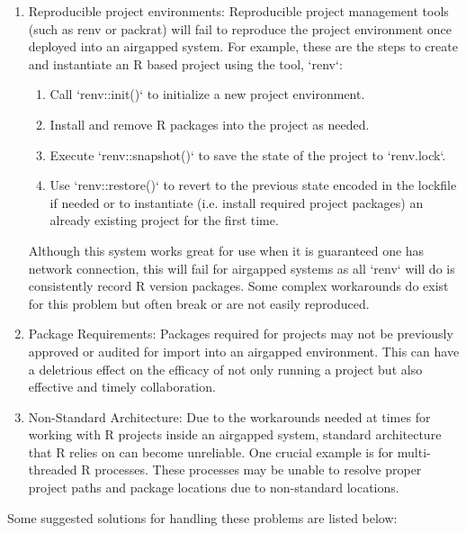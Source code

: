 \documentclass{amia}
\begin{document}
\begin{enumerate}
	\item Reproducible project environments: Reproducible project management tools (such as renv or packrat) will fail to reproduce the project environment once deployed into an airgapped system. For example, these are the steps to create and instantiate an R based project using the tool, `renv`:
		\begin{enumerate}
			\item Call `renv::init()` to initialize a new project environment.

			\item Install and remove R packages into the project as needed.

			\item Execute `renv::snapshot()` to save the state of the project to `renv.lock`.

			\item Use `renv::restore()` to revert to the previous state encoded in the lockfile if needed or to instantiate (i.e. install required project packages) an already existing project for the first time.
		\end{enumerate}
	Although this system works great for use when it is guaranteed one has network connection, this will fail for airgapped systems as all `renv` will do is consistently record R version packages. Some complex workarounds do exist for this problem but often break or are not easily reproduced. 
	\item Package Requirements: Packages required for projects may not be previously approved or audited for import into an airgapped environment. This can have a deletrious effect on the efficacy of not only running a project but also effective and timely collaboration. 
	\item Non-Standard Architecture: Due to the workarounds needed at times for working with R projects inside an airgapped system, standard architecture that R relies on can become unreliable. One crucial example is for multi-threaded R processes. These processes may be unable to resolve proper project paths and package locations due to non-standard locations.
\end{enumerate}

Some suggested solutions for handling these problems are listed below:
\end{document}
